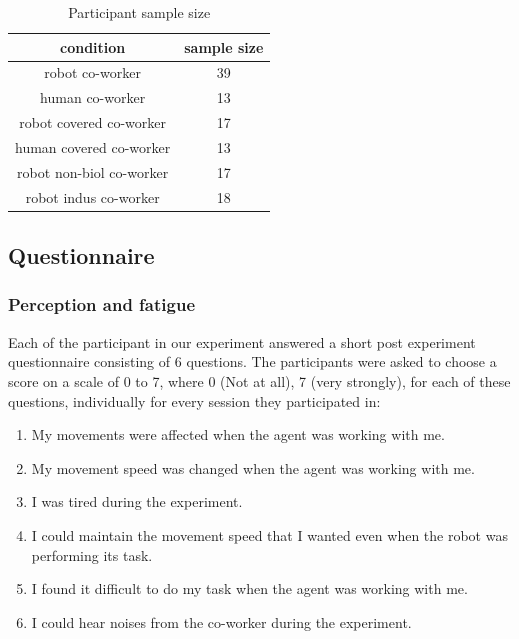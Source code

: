 \begin{table}[hpt]
	\caption{Participant sample size}
	\label{sizeTable}
	\begin{center}
		\begin{tabular}{|c c|}
			\hline  
			{\bf condition} &  {\bf sample size} \\ 
			\hline
			robot co-worker & 39 \\ 
			\hline
			human co-worker & 13 \\
			\hline
			robot covered co-worker & 17 \\
			\hline
			human covered co-worker & 13 \\
			\hline
			robot non-biol co-worker & 17 \\
			\hline
			robot indus co-worker & 18 \\
			\hline 			
		\end{tabular} 
	\end{center}
\end{table}


\subsection{Questionnaire}

\subsubsection{Perception and fatigue}

Each of the participant in our experiment answered a short post experiment questionnaire consisting of 6 questions. The participants were asked to choose a score on a scale of 0 to 7, where 0 (Not at all), 7 (very strongly), for each of these questions, individually for every session they participated in:

\begin{enumerate}[start=1,label={Q\arabic*.}]
	\item My movements were affected when the agent was working with me.
	\item My movement speed was changed when the agent was working with me.
	\item I was tired during the experiment.
	\item I could maintain the movement speed that I wanted even when the robot was performing its task.
	\item I found it difficult to do my task when the agent was working with me.
	\item I could hear noises from the co-worker during the experiment.
\end{enumerate}

